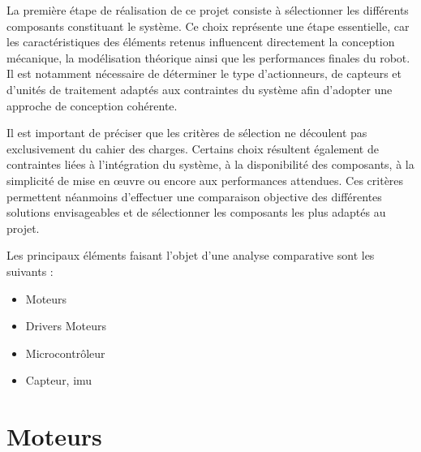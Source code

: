 La première étape de réalisation de ce projet consiste à sélectionner les différents composants constituant le système. Ce choix représente une étape essentielle, car les caractéristiques des éléments retenus influencent directement la conception mécanique, la modélisation théorique ainsi que les performances finales du robot. Il est notamment nécessaire de déterminer le type d'actionneurs, de capteurs et d'unités de traitement adaptés aux contraintes du système afin d'adopter une approche de conception cohérente.

Il est important de préciser que les critères de sélection ne découlent pas exclusivement du cahier des charges. Certains choix résultent également de contraintes liées à l'intégration du système, à la disponibilité des composants, à la simplicité de mise en œuvre ou encore aux performances attendues. Ces critères permettent néanmoins d'effectuer une comparaison objective des différentes solutions envisageables et de sélectionner les composants les plus adaptés au projet.

Les principaux éléments faisant l'objet d'une analyse comparative sont les suivants :

\begin{itemize}
    \item Moteurs
    \item Drivers Moteurs
    \item Microcontrôleur
    \item Capteur, \Gls{imu}
\end{itemize}


\section{Moteurs}

